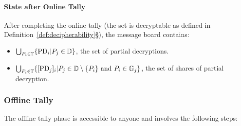\documentclass[runningheads]{llncs}
\begin{document}
\paragraph{State after Online Tally}

After completing the online tally (the set is decryptable as defined in Definition~\ref{def:decipherability}§), the message board contains:
\begin{itemize}
    \item $\bigcup_{P_{i} \in \mathbb{T}} \{\mathrm{PD}_{i} | P_{j} \in \mathbb{D}\}$, the set of partial decryptions.
    \item $\bigcup_{P_{i} \in \mathbb{T}} \{[\mathrm{PD}_{j}]_{i} | P_{j} \in \mathbb{D} \setminus \{P_{i}\} \text{ and } P_{i} \in \mathbb{G}_{j}\}$, the set of shares of partial decryption.
\end{itemize}

\subsubsection{Offline Tally}

The offline tally phase is accessible to anyone and involves the following steps:
\end{document}
